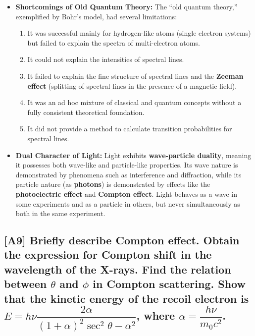 \documentclass[12pt]{article}
\begin{document}
\begin{itemize}
    \item \textbf{Shortcomings of Old Quantum Theory:} The ``old quantum theory,'' exemplified by Bohr's model, had several limitations:
    \begin{enumerate}[label=\roman*.]
        \item It was successful mainly for hydrogen-like atoms (single electron systems) but failed to explain the spectra of multi-electron atoms.
        \item It could not explain the intensities of spectral lines.
        \item It failed to explain the fine structure of spectral lines and the \textbf{Zeeman effect} (splitting of spectral lines in the presence of a magnetic field).
        \item It was an ad hoc mixture of classical and quantum concepts without a fully consistent theoretical foundation.
        \item It did not provide a method to calculate transition probabilities for spectral lines.
    \end{enumerate}
    \item \textbf{Dual Character of Light:} Light exhibits \textbf{wave-particle duality}, meaning it possesses both wave-like and particle-like properties. Its wave nature is demonstrated by phenomena such as interference and diffraction, while its particle nature (as \textbf{photons}) is demonstrated by effects like the \textbf{photoelectric effect} and \textbf{Compton effect}. Light behaves as a wave in some experiments and as a particle in others, but never simultaneously as both in the same experiment.
\end{itemize}

\subsection{[A9] Briefly describe Compton effect. Obtain the expression for Compton shift in the wavelength of the X-rays. Find the relation between $\theta$ and $\phi$ in Compton scattering. Show that the kinetic energy of the recoil electron is $E=h\nu \dfrac{2\alpha}{(1+\alpha)^2\sec^2\theta-\alpha^2}$, where $\alpha=\dfrac{h\nu}{m_0c^2}$.}
\end{document}
